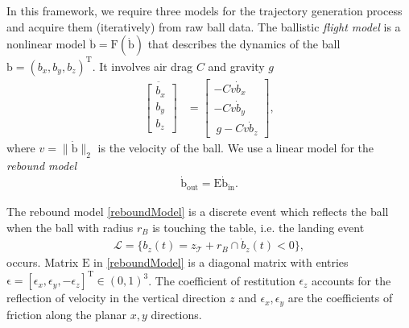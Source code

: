 \documentclass[letterpaper, 10 pt, conference]{ieeeconf}
\newcommand{\boldvec}[1]{\boldsymbol{\mathrm{#1}}}
\let\vec\boldvec
\newcommand{\ballFull}{\vec{x}_{B}} %
\newcommand{\ball}{\vec{b}} %
\newcommand{\ballRadius}{r_B}
\newcommand{\ballVel}{v}
\newcommand{\ballDynamics}{\vec{F}} %
\newcommand{\drag}{C} %
\newcommand{\gravity}{g}
\newcommand{\bounce}{\vec{E}}
\newcommand{\court}{\mathcal{T}} %
\newcommand{\landEvent}{\mathcal{L}} %
\begin{document}
In this framework, we require three models for the trajectory generation process and acquire them (iteratively) from raw ball data. The ballistic \emph{flight model} is a nonlinear model $\ddot{\ball} = \ballDynamics(\dot{\ball})$ that describes the dynamics of the ball $\ball = (b_x,b_y,b_z)^{\mathrm{T}}$. It involves air drag $\drag$ and gravity $\gravity$
%
\begin{align}
\ddot{\begin{bmatrix}
   b_x \\
   b_y \\
   b_z   
 \end{bmatrix}} &= 
 \begin{bmatrix}
 -\drag \ballVel \dot{b}_x  \\
 -\drag \ballVel \dot{b}_y  \\
 \ \gravity - \drag \ballVel \dot{b}_z 
 \end{bmatrix},
\label{flightModel}
\end{align}
%
\noindent where $\ballVel = \|\dot{\ball}\|_2$ is the velocity of the ball. We use a linear model for the \emph{rebound model}
%
\begin{align}
\dot{\ball}_{\mathrm{out}} = \bounce\dot{\ball}_{\mathrm{in}}.
\label{reboundModel}
\end{align}

\noindent The rebound model \eqref{reboundModel} is a discrete event which reflects the ball when the ball with radius $\ballRadius$ is touching the table, i.e. the landing event
%
\begin{align}
\landEvent = \{b_z(t) = z_{\court} + \ballRadius \cap \dot{b}_z(t) < 0\},
\label{landingEvent}
\end{align}
%
%
\noindent occurs. Matrix $\bounce$ in \eqref{reboundModel} is a diagonal matrix with entries $\vec{\epsilon} = [\epsilon_{x}, \epsilon_{y}, -\epsilon_{z}]^{\mathrm{T}} \in (0,1)^{3}$. The coefficient of restitution $\epsilon_{z}$ accounts for the reflection of velocity in the vertical direction $z$ and $\epsilon_{x}, \epsilon_{y}$ are the coefficients of friction along the planar $x,y$ directions.
\end{document}
